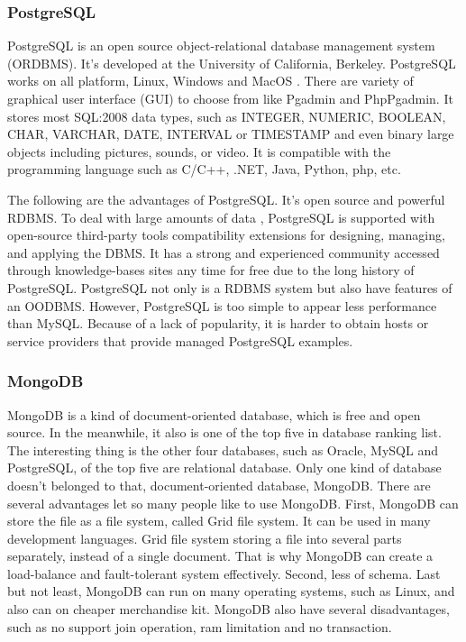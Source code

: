 \subsubsection{PostgreSQL}

PostgreSQL is an open source object-relational database management system (ORDBMS).
It's developed at the University of California, Berkeley.
PostgreSQL works on all platform, Linux, Windows and MacOS .
There are variety of graphical user interface (GUI)  to choose from like Pgadmin and PhpPgadmin.
It stores most SQL:2008 data types, such as INTEGER, NUMERIC, BOOLEAN, CHAR, VARCHAR, DATE, INTERVAL or TIMESTAMP and even binary large objects including pictures, sounds, or video.
It is compatible with the  programming language such as C/C++, .NET, Java, Python, php, etc.

The following are the  advantages of PostgreSQL.
It's open source  and powerful RDBMS.
To deal with large amounts of data , PostgreSQL is supported with  open-source third-party tools compatibility extensions for designing, managing, and applying the DBMS.
It has a strong and experienced community accessed through knowledge-bases sites any time for free due to the long history of PostgreSQL.
PostgreSQL not only is a RDBMS system but also have features of an OODBMS.
However, PostgreSQL is too simple to appear less performance than MySQL.
Because of a lack of popularity, it is harder to obtain hosts or service providers that provide managed PostgreSQL examples.


\subsubsection{MongoDB}
MongoDB is a kind of document-oriented database, which is free and open source. 
In the meanwhile, it also is one of the top five in database ranking list. 
The interesting thing is the other four databases, such as Oracle, MySQL and PostgreSQL, of the top five are relational database.
Only one kind of database doesn't belonged to that, document-oriented database, MongoDB.
There are several advantages let so many people like to use MongoDB.
First, MongoDB can store the file as a file system, called Grid file system.
It can be used in many development languages.
Grid file system storing a file into several parts separately, instead of a single document.
That is why MongoDB can create a load-balance and fault-tolerant system effectively.
Second, less of schema. 
Last but not least, MongoDB can run on many operating systems, such as Linux, and also can on cheaper merchandise kit.
MongoDB also have several disadvantages, such as no support join operation, ram limitation and no transaction.


